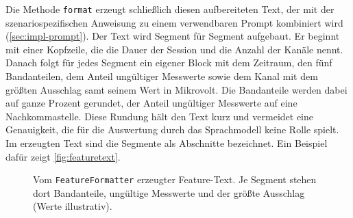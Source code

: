 \noindent Die Methode \texttt{format} erzeugt schließlich diesen aufbereiteten Text, der mit der szenariospezifischen Anweisung zu einem verwendbaren Prompt kombiniert wird (\autoref{sec:impl-prompt}). Der Text wird Segment für Segment aufgebaut. Er beginnt mit einer Kopfzeile, die die Dauer der Session und die Anzahl der Kanäle nennt. Danach folgt für jedes Segment ein eigener Block mit dem Zeitraum, den fünf Bandanteilen, dem Anteil ungültiger Messwerte sowie dem Kanal mit dem größten Ausschlag samt seinem Wert in Mikrovolt. Die Bandanteile werden dabei auf ganze Prozent gerundet, der Anteil ungültiger Messwerte auf eine Nachkommastelle. Diese Rundung hält den Text kurz und vermeidet eine Genauigkeit, die für die Auswertung durch das Sprachmodell keine Rolle spielt.
Im erzeugten Text sind die Segmente als Abschnitte bezeichnet. Ein Beispiel dafür zeigt \autoref{fig:featuretext}.
\begin{figure}[H]
\centering
{}
\caption[Beispiel eines Feature-Texts]{Vom \texttt{FeatureFormatter} erzeugter Feature-Text. Je Segment stehen dort Bandanteile, ungültige Messwerte und der größte Ausschlag (Werte illustrativ).}
\label{fig:featuretext}
\end{figure}

